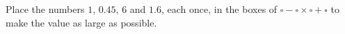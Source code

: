 Place the numbers $1$, $0.45$, $6$ and $1.6$, each once, in the boxes of $\square-\square\times\square+\square$ to make the value as large as possible.
